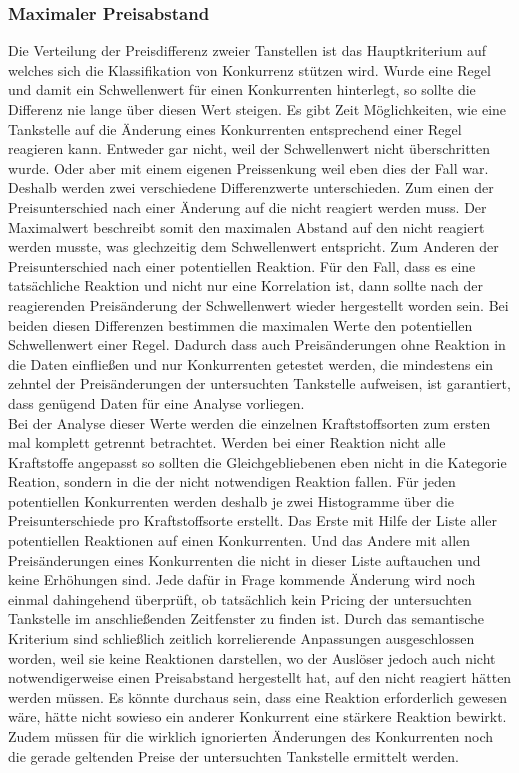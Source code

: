 \documentclass[12pt,a4paper,bibliography=totocnumbered,listof=totocnumbered]{scrartcl}
\begin{document}
\subsubsection{Maximaler Preisabstand}
Die Verteilung der Preisdifferenz zweier Tanstellen ist das Hauptkriterium auf welches sich die Klassifikation von Konkurrenz stützen wird. Wurde eine Regel und damit ein Schwellenwert für einen Konkurrenten hinterlegt, so sollte die Differenz nie lange über diesen Wert steigen. Es gibt Zeit Möglichkeiten, wie eine Tankstelle auf die Änderung eines Konkurrenten entsprechend einer Regel reagieren kann. Entweder gar nicht, weil der Schwellenwert nicht überschritten wurde. Oder aber mit einem eigenen Preissenkung weil eben dies der Fall war. Deshalb werden zwei verschiedene Differenzwerte unterschieden. Zum einen der Preisunterschied nach einer Änderung auf die nicht reagiert werden muss. Der Maximalwert beschreibt somit den maximalen Abstand auf den nicht reagiert werden musste, was glechzeitig dem Schwellenwert entspricht. Zum Anderen der Preisunterschied nach einer potentiellen Reaktion. Für den Fall, dass es eine tatsächliche Reaktion und nicht nur eine Korrelation ist, dann sollte nach der reagierenden Preisänderung der Schwellenwert wieder hergestellt worden sein. Bei beiden diesen Differenzen bestimmen die maximalen Werte den potentiellen Schwellenwert einer Regel. Dadurch dass auch Preisänderungen ohne Reaktion in die Daten einfließen und nur Konkurrenten getestet werden, die mindestens ein zehntel der Preisänderungen der untersuchten Tankstelle aufweisen, ist garantiert, dass genügend Daten für eine Analyse vorliegen.\\
Bei der Analyse dieser Werte werden die einzelnen Kraftstoffsorten zum ersten mal komplett getrennt betrachtet. Werden bei einer Reaktion nicht alle Kraftstoffe angepasst so sollten die Gleichgebliebenen eben nicht in die Kategorie Reation, sondern in die der nicht notwendigen Reaktion fallen. Für jeden potentiellen Konkurrenten werden deshalb je zwei Histogramme über die Preisunterschiede pro Kraftstoffsorte erstellt. Das Erste mit Hilfe der Liste aller potentiellen Reaktionen auf einen Konkurrenten. Und das Andere mit allen Preisänderungen eines Konkurrenten die nicht in dieser Liste auftauchen und keine Erhöhungen sind. Jede dafür in Frage kommende Änderung wird noch einmal dahingehend überprüft, ob tatsächlich kein Pricing der untersuchten Tankstelle im anschließenden Zeitfenster zu finden ist. Durch das semantische Kriterium sind schließlich zeitlich korrelierende Anpassungen ausgeschlossen worden, weil sie keine Reaktionen darstellen, wo der Auslöser jedoch auch nicht notwendigerweise einen Preisabstand hergestellt hat, auf den nicht reagiert hätten werden müssen. Es könnte durchaus sein, dass eine Reaktion erforderlich gewesen wäre, hätte nicht sowieso ein anderer Konkurrent eine stärkere Reaktion bewirkt. Zudem müssen für die wirklich ignorierten Änderungen des Konkurrenten noch die gerade geltenden Preise der untersuchten Tankstelle ermittelt werden.\\
\end{document}
